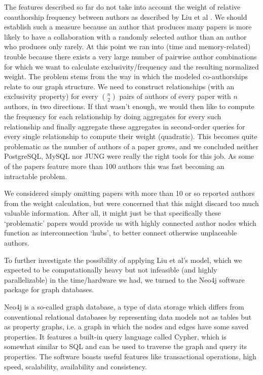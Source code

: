 The features described so far do not take into account the weight of relative coauthorship frequency between authors as described by Liu et al \cite{liu2005co}.
We should establish such a measure because an author that produces many papers is more likely to have a collaboration with a randomly selected author than an author who produces only rarely.
At this point we ran into (time and memory-related) trouble because there exists a very large number of pairwise author combinations for which we want to calculate exclusivity/frequency and the resulting normalized weight.
The problem stems from the way in which the modeled co-authorships relate to our graph structure.
We need to construct relationships (with an exclusivity property) for every $n \choose 2$ pairs of authors of every paper with $n$ authors, in two directions.
If that wasn't enough, we would then like to compute the frequency for each relationship by doing aggregates for every such relationship and finally aggregate these aggregates in second-order queries for every single relationship to compute their weight (quadratic).
This becomes quite problematic as the number of authors of a paper grows, and we concluded neither PostgreSQL, MySQL nor JUNG were really the right tools for this job.
As some of the papers feature more than 100 authors this was fast becoming an intractable problem.

We considered simply omitting papers with more than 10 or so reported authors from the weight calculation, but were concerned that this might discard too much valuable information.
After all, it might just be that specifically these `problematic' papers would provide us with highly connected author nodes which function as interconnection `hubs', to better connect otherwise unplaceable authors.

To further investigate the possibility of applying Liu et al's model, which we expected to be computationally heavy but not infeasible (and highly parallelizable) in the time/hardware we had, we turned to the Neo4j software package for graph databases.

Neo4j is a so-called graph database, a type of data storage which differs from conventional relational databases by representing data models not as tables but as property graphs, i.e. a graph in which the nodes and edges have some saved properties.
It features a built-in query language called Cypher, which is somewhat similar to SQL and can be used to traverse the graph and query its properties.
The software boasts useful features like transactional operations, high speed, scalability, availability and consistency.

